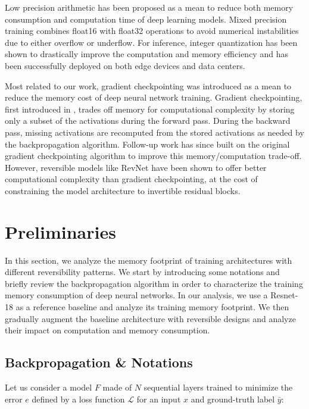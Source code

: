 \documentclass[twocolumn]{bmcart}
\begin{document}
Low precision arithmetic has been proposed as a mean to reduce both memory consumption and computation time of deep learning models. Mixed precision training \cite{micikevicius2017mixed} combines float16 with float32 operations to avoid numerical instabilities due to either overflow or underflow.
For inference,  integer quantization \cite{jacob2018quantization,wu2018training} has been shown to drastically improve the computation and memory efficiency and has been successfully deployed on both edge devices and data centers.

Most related to our work, gradient checkpointing was introduced as a mean to reduce the memory cost of deep neural network training.
Gradient checkpointing, first introduced in \cite{martens2012training}, trades off memory for computational complexity by storing only a subset of the activations during the forward pass.
During the backward pass, missing activations are recomputed from the stored activations as needed by the backpropagation algorithm.
Follow-up work \cite{chen2016training} has since built on the original gradient checkpointing algorithm to improve this memory/computation trade-off.  
However, reversible models like RevNet have been shown to offer better computational complexity than gradient checkpointing,
at the cost of constraining the model architecture to invertible residual blocks.

\section{Preliminaries}

In this section, we analyze the memory footprint of training architectures with different reversibility patterns.
We start by introducing some notations and briefly review the backpropagation algorithm
in order to characterize the training memory consumption of deep neural networks. 
In our analysis, we use a Resnet-18 as a reference baseline and analyze its training memory footprint.
We then gradually augment the baseline architecture with reversible designs and analyze their impact on computation and memory consumption.

\subsection{Backpropagation \& Notations}

Let us consider a model $F$ made of $N$ sequential layers trained to minimize the error $e$ defined by a loss function $\mathcal{L}$ for an input $x$ and ground-truth label $\bar{y}$:
\end{document}
